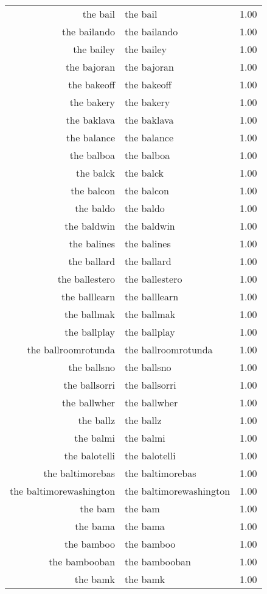 \begin{table}[ht]
\begin{tabular}{rlr}
  the bail & the bail & 1.00 \\ 
  the bailando & the bailando & 1.00 \\ 
  the bailey & the bailey & 1.00 \\ 
  the bajoran & the bajoran & 1.00 \\ 
  the bakeoff & the bakeoff & 1.00 \\ 
  the bakery & the bakery & 1.00 \\ 
  the baklava & the baklava & 1.00 \\ 
  the balance & the balance & 1.00 \\ 
  the balboa & the balboa & 1.00 \\ 
  the balck & the balck & 1.00 \\ 
  the balcon & the balcon & 1.00 \\ 
  the baldo & the baldo & 1.00 \\ 
  the baldwin & the baldwin & 1.00 \\ 
  the balines & the balines & 1.00 \\ 
  the ballard & the ballard & 1.00 \\ 
  the ballestero & the ballestero & 1.00 \\ 
  the balllearn & the balllearn & 1.00 \\ 
  the ballmak & the ballmak & 1.00 \\ 
  the ballplay & the ballplay & 1.00 \\ 
  the ballroomrotunda & the ballroomrotunda & 1.00 \\ 
  the ballsno & the ballsno & 1.00 \\ 
  the ballsorri & the ballsorri & 1.00 \\ 
  the ballwher & the ballwher & 1.00 \\ 
  the ballz & the ballz & 1.00 \\ 
  the balmi & the balmi & 1.00 \\ 
  the balotelli & the balotelli & 1.00 \\ 
  the baltimorebas & the baltimorebas & 1.00 \\ 
  the baltimorewashington & the baltimorewashington & 1.00 \\ 
  the bam & the bam & 1.00 \\ 
  the bama & the bama & 1.00 \\ 
  the bamboo & the bamboo & 1.00 \\ 
  the bambooban & the bambooban & 1.00 \\ 
  the bamk & the bamk & 1.00 \\ 

\end{tabular}
\end{table}
